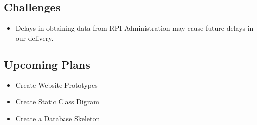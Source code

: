 \documentclass[11pt]{article}
\begin{document}
\subsection{Challenges}
\begin{itemize}
\item Delays in obtaining data from RPI Administration may cause future delays in our delivery.
\end{itemize}

\subsection{Upcoming Plans}
\begin{itemize}
\item Create Website Prototypes
\item Create Static Class Digram
\item Create a Database Skeleton
\end{itemize}
\end{document}
